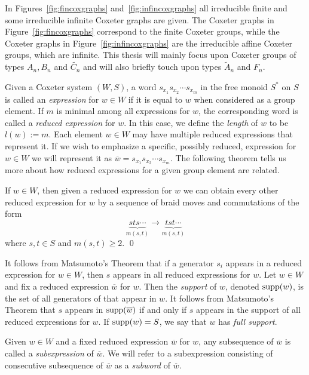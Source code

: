 In Figures~\ref{fig:fincoxgraphs} and~\ref{fig:infincoxgraphs} all irreducible finite and some irreducible infinite Coxeter graphs are given. The Coxeter graphs in Figure~\ref{fig:fincoxgraphs} correspond to the finite Coxeter groups, while the Coxeter graphs in Figure~\ref{fig:infincoxgraphs} are the irreducible affine Coxeter groups, which are infinite. This thesis will mainly focus upon Coxeter groups of types $A_n, B_n$ and $\widetilde{C_n}$ and will also briefly touch upon types $\widetilde{A}_n$ and $F_n$.

Given a Coxeter system $(W,S)$, a word $s_{x_1}s_{x_2} \cdots s_{x_m}$ in the free monoid $S^*$ on $S$ is called an \emph{expression} for $w \in W$ if it is equal to $w$ when considered as a group element. If $m$ is minimal among all expressions for $w$, the corresponding word is called a \emph{reduced expression} for $w$. In this case, we define the \emph{length} of $w$ to be $l(w):= m$. Each element $w \in W$ may have multiple reduced expressions that represent it. If we wish to emphasize a specific, possibly reduced, expression for $w \in W$ we will represent it as $\overline{w}=s_{x_1}s_{x_2}\cdots s_{x_m}.$ The following theorem tells us more about how reduced expressions for a given group element are related.

\begin{theorem} 
	If $w \in W$, then given a reduced expression for $w$ we can obtain every other reduced expression for $w$ by a sequence of braid moves and commutations of the form
	\[\underbrace{sts\cdots}_{m(s,t)} \rightarrow \underbrace{tst\cdots}_{m(s,t)}\]
	where $s,t \in S$ and $m(s,t) \geq 2$. \qed
\end{theorem}
 
It follows from Matsumoto's Theorem that if a generator $s_i$ appears in a reduced expression for $w \in W$, then $s$ appears in all reduced expressions for $w$. Let $w \in W$ and fix a reduced expression $\overline{w}$ for $w$. Then the \emph{support} of $w$, denoted $\mathrm{supp}(w)$, is the set of all generators of that appear in $w$. It follows from Matsumoto's Theorem that $s$ appears in $\mathrm{supp}(\overline{w})$ if and only if $s$ appears in the support of all reduced expressions for $w$. If $\mathrm{supp}(w)=S$, we say that $w$ has \emph{full support}. 

Given $w \in W$ and a fixed reduced expression $\overline{w}$ for $w$, any subsequence of $\overline{w}$ is called a \emph{subexpression} of $\overline{w}$. We will refer to a subexpression consisting of consecutive subsequence of $\overline{w}$ as a \emph{subword} of $\overline{w}$.\\

